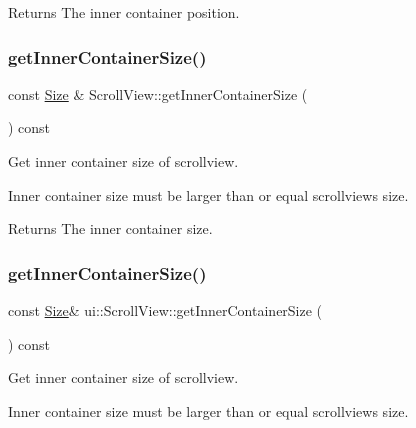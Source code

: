 \begin{DoxyReturn}{Returns}
The inner container position. 
\end{DoxyReturn}
\mbox{\label{classui_1_1ScrollView_aa1767cb627e7d48b7f031e620d44f656}} 
\subsubsection{\texorpdfstring{get\+Inner\+Container\+Size()}{getInnerContainerSize()}\hspace{0.1cm}{\footnotesize\ttfamily [1/2]}}
{\footnotesize\ttfamily const \hyperlink{classSize}{Size} \& Scroll\+View\+::get\+Inner\+Container\+Size (\begin{DoxyParamCaption}{ }\end{DoxyParamCaption}) const}

Get inner container size of scrollview.

Inner container size must be larger than or equal scrollview\textquotesingle{}s size.

\begin{DoxyReturn}{Returns}
The inner container size. 
\end{DoxyReturn}
\mbox{\label{classui_1_1ScrollView_a63fea0daa8025c5733d630b43a1ae4a9}} 
\subsubsection{\texorpdfstring{get\+Inner\+Container\+Size()}{getInnerContainerSize()}\hspace{0.1cm}{\footnotesize\ttfamily [2/2]}}
{\footnotesize\ttfamily const \hyperlink{classSize}{Size}\& ui\+::\+Scroll\+View\+::get\+Inner\+Container\+Size (\begin{DoxyParamCaption}{ }\end{DoxyParamCaption}) const}

Get inner container size of scrollview.

Inner container size must be larger than or equal scrollview\textquotesingle{}s size.

